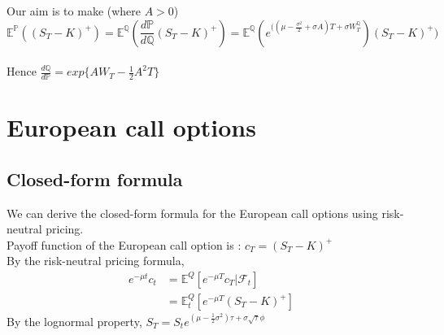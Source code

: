 Our aim is to make (where $A>0$)
$$\mathbb{E}^{\mathbb{P}}((S_{T} - K)^{+})= \mathbb{E}^{\mathbb{Q}}(\frac{d\mathbb{P}}{d\mathbb{Q}}(S_{T} - K)^{+}) = \mathbb{E}^{\mathbb{Q}}(e^{((\mu - \frac{\sigma^{2}}{2}+\sigma A)T + \sigma W_{T}^{\mathbb{Q}}})(S_{T} - K)^{+})$$\\[4mm]
Hence $\frac{d\mathbb{Q}}{d\mathbb{P}} = exp\{AW_{T} - \frac{1}{2}A^{2}T\}$
\newpage
\section{European call options}
\subsection{Closed-form formula}
We can derive the closed-form formula for the European call options using risk-neutral pricing.\\
Payoff function of the European call option is : $c_{T} = (S_{T} - K)^{+}$\\
By the risk-neutral pricing formula,
\begin{equation}
\begin{split}
e^{-\mu t}c_{t}
&= \mathbb{E}^{Q}[e^{-\mu T}c_{T} | \mathcal{F}_{t}]\\
&= \mathbb{E}_{t}^{Q}[e^{-\mu T}(S_{T} - K)^{+}]
\end{split}
\end{equation}
By the lognormal property, \quad
$S_{T} = S_{t}e^{(\mu - \frac{1}{2}\sigma^{2})\tau + \sigma\sqrt{\tau}\phi}$
